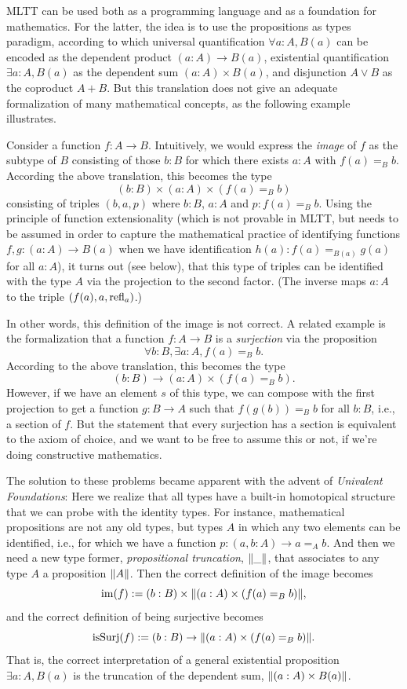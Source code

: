 \documentclass[10pt,oneside,leqno,openright]{memoir}
\begin{document}
MLTT can be used both as a programming language and as a foundation for mathematics. For the latter, the idea is to use the propositions as types paradigm, according to which universal quantification $\forall a:A, B(a)$ can be encoded as the dependent product $(a:A) \to B(a)$, existential quantification $\exists a:A, B(a)$ as the dependent sum $(a:A) \times B(a)$, and disjunction $A \vee B$ as the coproduct $A + B$.
But this translation does not give an adequate formalization of many mathematical concepts, as the following example illustrates.

Consider a function $f : A \to B$. Intuitively, we would express the
\emph{image} of $f$ as the subtype of $B$ consisting of those $b:B$ for which
there exists $a:A$ with $f(a)=_Bb$. According the above translation, this becomes the type
\[(b:B)\times(a:A)\times(f(a)=_Bb)\]
consisting of triples $(b,a,p)$ where $b:B$, $a:A$ and $p:f(a)=_Bb$.
Using the principle of function extensionality (which is not provable in MLTT, but needs to be assumed in order to capture the mathematical practice of identifying functions $f,g : (a:A) \to B(a)$ when we have identification $h(a):f(a)=_{B(a)}g(a)$ for all $a:A$),
it turns out (see below), that this type of triples can be identified with the type $A$ via the projection to the second factor. (The inverse maps $a:A$ to the triple $(f(a), a, \mathrm{refl}_a)$.)

In other words, this definition of the image is not correct. A related example
is the formalization that a function $f : A \to B$ is a \emph{surjection} via
the proposition
\[\forall b:B, \exists a:A, f(a) =_B b.\]
According to the above translation, this becomes the type
\[(b:B) \to (a:A)\times(f(a)=_B b).\]
However, if we have an element $s$ of this type, we can compose with the first projection
to get a function $g : B \to A$ such that $f(g(b))=_Bb$ for all $b:B$, i.e.,
a section of $f$.
But the statement that every surjection has a section is equivalent to the axiom of choice, and we want to be free to assume this or not, if we're doing constructive mathematics.

The solution to these problems became apparent with the advent of \emph{Univalent Foundations}: Here we realize that all types have a built-in homotopical structure that we can probe with the identity types. For instance, mathematical propositions are not any old types, but types $A$ in which any two elements can be identified, i.e., for which we have a function $p:(a,b:A) \to a=_Ab$. And then we need a new type former, \emph{propositional truncation}, $\lVert\_\rVert$, that associates to any type $A$ a proposition $\lVert A\rVert$. Then the correct definition of the image becomes
\[\operatorname{im}(f) := (b : B) \times \lVert(a:A) \times (f(a)=_B b)\rVert,\]
and the correct definition of being surjective becomes
\[\operatorname{isSurj}(f) := (b : B) \to \lVert(a:A) \times (f(a)=_Bb)\rVert.\]
That is, the correct interpretation of a general existential proposition $\exists a:A, B(a)$ is the truncation of the dependent sum, $\lVert(a:A)\times B(a)\rVert$.
\end{document}
